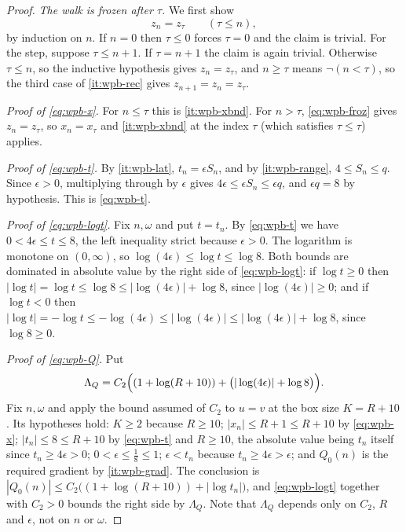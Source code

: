 \begin{proof}
\emph{The walk is frozen after $\tau$.} We first show
\begin{equation}\label{eq:wpb-froz}
  z_n=z_{\tau}\qquad(\tau\le n),
\end{equation}
by induction on $n$. If $n=0$ then $\tau\le0$ forces $\tau=0$ and the claim is
trivial. For the step, suppose $\tau\le n+1$. If $\tau=n+1$ the claim is again
trivial. Otherwise $\tau\le n$, so the inductive hypothesis gives
$z_n=z_\tau$, and $n\ge\tau$ means $\neg(n<\tau)$, so the third case of
\ref{it:wpb-rec} gives $z_{n+1}=z_n=z_\tau$.

\emph{Proof of \eqref{eq:wpb-x}.} For $n\le\tau$ this is \ref{it:wpb-xbnd}. For
$n>\tau$, \eqref{eq:wpb-froz} gives $z_n=z_\tau$, so $x_n=x_\tau$ and
\ref{it:wpb-xbnd} at the index $\tau$ (which satisfies $\tau\le\tau$) applies.

\emph{Proof of \eqref{eq:wpb-t}.} By \ref{it:wpb-lat}, $t_n=\epsilon S_n$, and
by \ref{it:wpb-range}, $4\le S_n\le q$. Since $\epsilon>0$, multiplying through
by $\epsilon$ gives $4\epsilon\le\epsilon S_n\le\epsilon q$, and
$\epsilon q=8$ by hypothesis. This is \eqref{eq:wpb-t}.

\emph{Proof of \eqref{eq:wpb-logt}.} Fix $n,\omega$ and put $t=t_n$. By
\eqref{eq:wpb-t} we have $0<4\epsilon\le t\le8$, the left inequality strict
because $\epsilon>0$. The logarithm is monotone on $(0,\infty)$, so
$\log(4\epsilon)\le\log t\le\log 8$. Both bounds are dominated in absolute
value by the right side of \eqref{eq:wpb-logt}: if $\log t\ge0$ then
$|\log t|=\log t\le\log 8\le|\log(4\epsilon)|+\log 8$, since
$|\log(4\epsilon)|\ge0$; and if $\log t<0$ then
$|\log t|=-\log t\le-\log(4\epsilon)\le|\log(4\epsilon)|
\le|\log(4\epsilon)|+\log 8$, since $\log 8\ge0$.

\emph{Proof of \eqref{eq:wpb-Q}.} Put
\[
  \Lambda_Q=C_2\Bigl((1+\log(R+10))+\bigl(|\log(4\epsilon)|+\log 8\bigr)\Bigr).
\]
Fix $n,\omega$ and apply the bound assumed of $C_2$ to $u=v$ at the box size
$K=R+10$. Its hypotheses hold: $K\ge2$ because $R\ge10$; $|x_n|\le R+1\le R+10$
by \eqref{eq:wpb-x}; $|t_n|\le8\le R+10$ by \eqref{eq:wpb-t} and $R\ge10$, the
absolute value being $t_n$ itself since $t_n\ge4\epsilon>0$;
$0<\epsilon\le\tfrac18\le1$; $\epsilon<t_n$ because $t_n\ge4\epsilon>\epsilon$;
and $Q_0(n)$ is the required gradient by \ref{it:wpb-grad}. The conclusion is
$|Q_0(n)|\le C_2\bigl((1+\log(R+10))+|\log t_n|\bigr)$, and
\eqref{eq:wpb-logt} together with $C_2>0$ bounds the right side by
$\Lambda_Q$. Note that $\Lambda_Q$ depends only on $C_2$, $R$ and $\epsilon$,
not on $n$ or $\omega$.


\end{proof}
